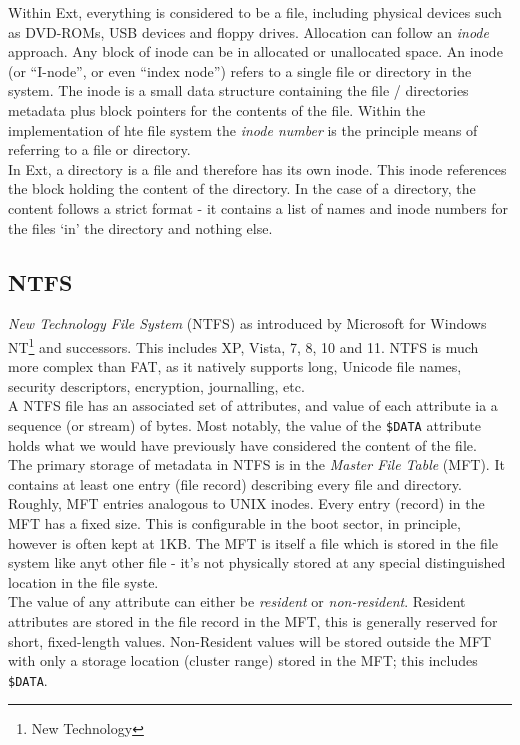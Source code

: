 Within Ext, everything is considered to be a file, including physical devices such as DVD-ROMs, USB devices and floppy drives. Allocation can follow an \textit{inode} approach. Any block of inode can be in allocated or unallocated space. An inode (or ``I-node'', or even ``index node'') refers to a single file or directory in the system. The inode is a small data structure containing the file / directories metadata plus block pointers for the contents of the file. Within the implementation of hte file system the \textit{inode number} is the principle means of referring to a file or directory.\\

In Ext, a directory is a file and therefore has its own inode. This inode references the block holding the content of the directory. In the case of a directory, the content follows a strict format - it contains a list of names and inode numbers for the files `in' the directory and nothing else.

\subsection{NTFS}
\textit{New Technology File System} (NTFS) as introduced by Microsoft for Windows NT\footnote{New Technology} and successors. This includes XP, Vista, 7, 8, 10 and 11. NTFS is much more complex than FAT, as it natively supports long, Unicode file names, security descriptors, encryption, journalling, etc.\\

A NTFS file has an associated set of attributes, and value of each attribute ia a sequence (or stream) of bytes. Most notably, the value of the \verb|$DATA| attribute holds what we would have previously have considered the content of the file.\\

The primary storage of metadata in NTFS is in the \textit{Master File Table} (MFT). It contains at least one entry (file record) describing every file and directory. Roughly, MFT entries analogous to UNIX inodes. Every entry (record) in the MFT has a fixed size. This is configurable in the boot sector, in principle, however is often kept at 1KB. The MFT is itself a file which is stored in the file system like anyt other file - it's not physically stored at any special distinguished location in the file syste.\\

The value of any attribute can either be \textit{resident} or \textit{non-resident}. Resident attributes are stored in the file record in the MFT, this is generally reserved for short, fixed-length values. Non-Resident values will be stored outside the MFT with only a storage location (cluster range) stored in the MFT; this includes \verb|$DATA|. 